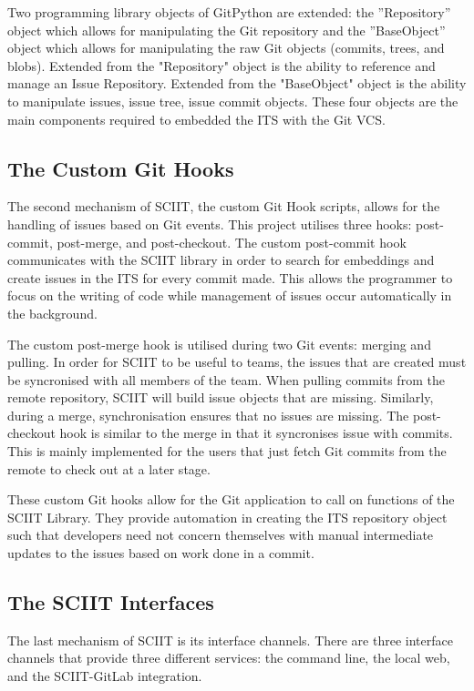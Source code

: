 \documentclass{mproj}
\begin{document}
Two programming library objects of GitPython are extended: the ”Repository” object which allows for manipulating the Git repository and the ”BaseObject” object which allows for manipulating the raw Git objects (commits, trees, and blobs). Extended from the "Repository" object is the ability to reference and manage an Issue Repository. Extended from the "BaseObject" object is the ability to manipulate issues, issue tree, issue commit objects. These four objects are the main components required to embedded the ITS with the Git VCS.


\subsection{The Custom Git Hooks}

The second mechanism of SCIIT, the custom Git Hook scripts, allows for the handling of issues based on Git events. This project utilises three hooks: post-commit, post-merge, and post-checkout. The custom post-commit hook communicates with the SCIIT library in order to search for embeddings and create issues in the ITS for every commit made. This allows the programmer to focus on the writing of code while management of issues occur automatically in the background. 

The custom post-merge hook is utilised during two Git events: merging and pulling. In order for SCIIT to be useful to teams, the issues that are created must be syncronised with all members of the team. When pulling commits from the remote repository, SCIIT will build issue objects that are missing. Similarly, during a merge, synchronisation ensures that no issues are missing. The post-checkout hook is similar to the merge in that it syncronises issue with commits. This is mainly implemented for the users that just fetch Git commits from the remote to check out at a later stage.

These custom Git hooks allow for the Git application to call on functions of the SCIIT Library. They provide automation in creating the ITS repository object such that developers need not concern themselves with manual intermediate updates to the issues based on work done in a commit. 

\subsection{The SCIIT Interfaces}

The last mechanism of SCIIT is its interface channels. There are three interface channels that provide three different services: the command line, the local web, and the SCIIT-GitLab integration.
\end{document}
